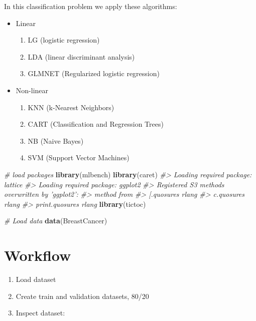 \documentclass[]{book}
\newenvironment{Shaded}{\begin{snugshade}}{\end{snugshade}}
\newcommand{\CommentTok}[1]{\textcolor[rgb]{0.56,0.35,0.01}{\textit{#1}}}
\newcommand{\KeywordTok}[1]{\textcolor[rgb]{0.13,0.29,0.53}{\textbf{#1}}}
\newcommand{\NormalTok}[1]{#1}
\providecommand{\tightlist}{%
  \setlength{\itemsep}{0pt}\setlength{\parskip}{0pt}}
\begin{document}
In this classification problem we apply these algorithms:

\begin{itemize}
\tightlist
\item
  Linear

  \begin{enumerate}
  \def\labelenumi{\arabic{enumi}.}
  \tightlist
  \item
    LG (logistic regression)
  \item
    LDA (linear discriminant analysis)
  \item
    GLMNET (Regularized logistic regression)
  \end{enumerate}
\item
  Non-linear

  \begin{enumerate}
  \def\labelenumi{\arabic{enumi}.}
  \setcounter{enumi}{3}
  \tightlist
  \item
    KNN (k-Nearest Neighbors)
  \item
    CART (Classification and Regression Trees)
  \item
    NB (Naive Bayes)
  \item
    SVM (Support Vector Machines)
  \end{enumerate}
\end{itemize}

\begin{Shaded}
\begin{Highlighting}[]
\CommentTok{# load packages}
\KeywordTok{library}\NormalTok{(mlbench)}
\KeywordTok{library}\NormalTok{(caret)}
\CommentTok{#> Loading required package: lattice}
\CommentTok{#> Loading required package: ggplot2}
\CommentTok{#> Registered S3 methods overwritten by 'ggplot2':}
\CommentTok{#>   method         from }
\CommentTok{#>   [.quosures     rlang}
\CommentTok{#>   c.quosures     rlang}
\CommentTok{#>   print.quosures rlang}
\KeywordTok{library}\NormalTok{(tictoc)}

\CommentTok{# Load data}
\KeywordTok{data}\NormalTok{(BreastCancer)}
\end{Highlighting}
\end{Shaded}

\hypertarget{workflow-3}{%
\section{Workflow}\label{workflow-3}}

\begin{enumerate}
\def\labelenumi{\arabic{enumi}.}
\tightlist
\item
  Load dataset
\item
  Create train and validation datasets, 80/20
\item
  Inspect dataset:
\end{enumerate}
\end{document}
